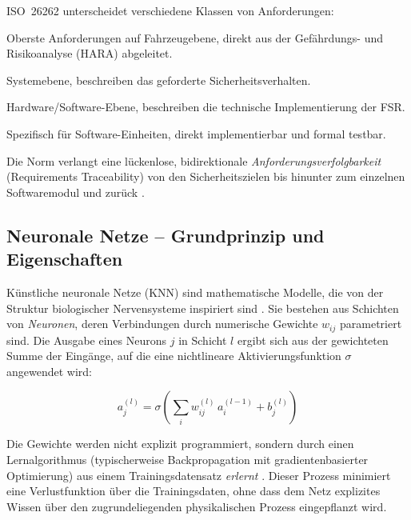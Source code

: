 ﻿\documentclass[12pt,a4paper]{article}
\begin{document}
ISO~26262 unterscheidet verschiedene Klassen von Anforderungen:

\begin{description}[leftmargin=2cm, style=nextline]
  \item[Sicherheitsziele (Safety Goals):] Oberste Anforderungen auf Fahrzeugebene,
    direkt aus der Gefährdungs- und Risikoanalyse (HARA) abgeleitet.
  \item[Funktionale Sicherheitsanforderungen (FSR):] Systemebene, beschreiben das
    geforderte Sicherheitsverhalten.
  \item[Technische Sicherheitsanforderungen (TSR):] Hardware/Software-Ebene,
    beschreiben die technische Implementierung der FSR.
  \item[Software-Sicherheitsanforderungen (SSR):] Spezifisch f\"ur Software-Einheiten,
    direkt implementierbar und formal testbar.
\end{description}

Die Norm verlangt eine l\"uckenlose, bidirektionale
\emph{Anforderungsverfolgbarkeit} (Requirements Traceability) von den Sicherheitszielen
bis hinunter zum einzelnen Softwaremodul und zur\"uck \cite{iso26262_6}.

\subsection{Neuronale Netze -- Grundprinzip und Eigenschaften}
\label{subsec:knn_grundlagen}

K\"unstliche neuronale Netze (KNN) sind mathematische Modelle, die von der Struktur
biologischer Nervensysteme inspiriert sind \cite{Rumelhart1986}. Sie bestehen aus
Schichten von \emph{Neuronen}, deren Verbindungen durch numerische Gewichte
$w_{ij}$ parametriert sind. Die Ausgabe eines Neurons $j$ in Schicht $l$ ergibt sich
aus der gewichteten Summe der Eing\"ange, auf die eine nichtlineare
Aktivierungsfunktion $\sigma$ angewendet wird:

\begin{equation}
  a_j^{(l)} = \sigma\!\left(\sum_{i} w_{ij}^{(l)}\, a_i^{(l-1)} + b_j^{(l)}\right)
  \label{eq:neuron}
\end{equation}

Die Gewichte werden nicht explizit programmiert, sondern durch einen Lernalgorithmus
(typischerweise Backpropagation mit gradientenbasierter Optimierung) aus einem
Trainingsdatensatz \emph{erlernt} \cite{Goodfellow2016}. Dieser Prozess minimiert
eine Verlustfunktion \"uber die Trainingsdaten, ohne dass dem Netz explizites Wissen
\"uber den zugrundeliegenden physikalischen Prozess eingepflanzt wird.
\end{document}
